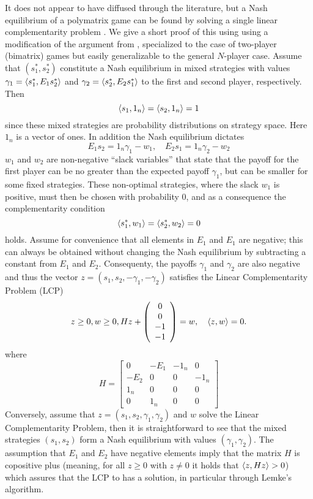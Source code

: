 It does not appear to have diffused through the literature, but a Nash equilibrium of a polymatrix game can be found by solving a single linear complementarity problem \citep{miller1991copositive}. We give a short proof of this using using a modification of the argument from \citep{miller1991copositive}, specialized to the case of two-player (bimatrix) games but easily generalizable to the general $N$-player case. Assume that $(s^*_1,s^*_2)$ constitute a Nash equilibrium in mixed strategies with values $\gamma_1 = \left \langle s^*_1,E_1 s^*_2 \right \rangle$ and  $\gamma_2 = \left \langle s^*_2,E_2 s^*_1 \right \rangle$ to the first and second player, respectively. Then
\[
  \left \langle s_1,1_n \right \rangle =
  \left \langle s_2,1_n \right \rangle =
  1
\]
since these mixed strategies are probability distributions on strategy space. Here $1_n$ is a vector of ones. In addition the Nash equilibrium dictates
\[
  E_1 s_2 = 1_n \gamma_1 - w_1
  ,\quad
  E_2 s_1 = 1_n \gamma_2  - w_2
\]
$w_1$ and $w_2$ are non-negative ``slack variables'' that state that the payoff for the first player can be no greater than the expected payoff $\gamma_1$, but can be smaller for some fixed strategies. These non-optimal strategies, where the slack $w_1$ is positive, must then be chosen with probability 0, and as a consequence the complementarity condition
\[
  \left \langle s^*_1,w_1 \right \rangle =   \left \langle s^*_2,w_2 \right \rangle = 0
\]
holds. Assume for convenience that all elements in $E_1$ and $E_1$ are negative; this can always be obtained without changing the Nash equilibrium by subtracting a constant from $E_1$ and $E_2$. Consequenty, the payoffs $\gamma_1$ and $\gamma_2$ are also negative and thus the vector $z = (s_1,s_2,-\gamma_1,-\gamma_2)$ satisfies the Linear Complementarity Problem (LCP)
\begin{equation}
  z \geq 0,
  w \geq 0 ,
  H
  z
  +
  \left(
    \begin{array}{c}
      0 \\
      0 \\
      -1 \\
      -1
    \end{array}
  \right)
  =
  w
  ,
  \quad
  \left \langle z,w \right \rangle = 0
  .  \label{eq:lcp}
\end{equation}
where
\[
  H =
  \left[
    \begin{array}{cccc}
      0 & -E_1 & -1_n & 0 \\ -E_2 & 0 & 0 & -1_n \\
      1_n & 0 & 0 & 0 \\
      0 & 1_n & 0 & 0
    \end{array}
  \right]
\]
Conversely, assume that $z=(s_1,s_2,\gamma_1,\gamma_2)$ and $w$ solve the Linear Complementarity Problem, then it is straightforward to see that the mixed strategies $(s_1,s_2)$ form a Nash equilibrium with values $(\gamma_1,\gamma_2)$. The assumption that $E_1$ and $E_2$ have negative elements imply that the matrix $H$ is copositive plus (meaning, for all $z\geq0$ with $z\neq0$ it holds that $\left \langle z,Hz \right \rangle>0$) which assures that the LCP to has a solution, in particular through Lemke's algorithm.

